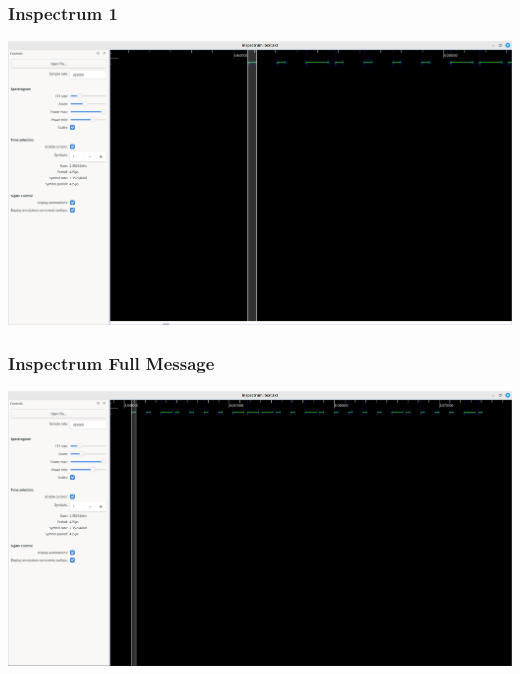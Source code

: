 \documentclass{beamer}
\begin{document}
\begin{frame}
\frametitle{Inspectrum 1}
  \includegraphics[width=\textwidth]{../Pics/screenshots/inspectrum-1.png}
\end{frame}

\begin{frame}
\frametitle{Inspectrum Full Message}
  \includegraphics[width=\textwidth]{../Pics/screenshots/inspectrum_full_message.png}
\end{frame}
\end{document}
